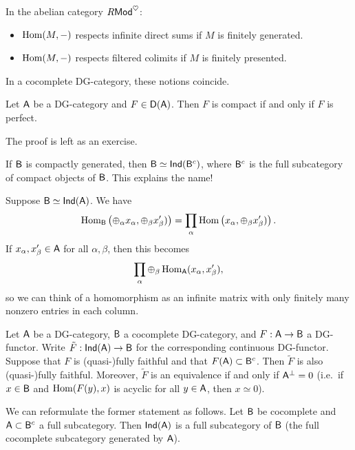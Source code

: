 \documentclass{amsart}
\begin{document}
\begin{rmk}
	In the abelian category $R\mathsf{Mod}^\heartsuit$:
	\begin{itemize}
		\item $\operatorname{Hom}(M, -)$ respects infinite direct sums if $M$ is finitely generated.
		\item $\operatorname{Hom}(M, -)$ respects filtered colimits if $M$ is finitely presented.
	\end{itemize}
	In a cocomplete DG-category, these notions coincide.
\end{rmk}

\begin{prop}
	Let $\mathsf{A}$ be a DG-category and $F \in \mathsf{D}(\mathsf{A})$.
	Then $F$ is compact if and only if $F$ is perfect.
\end{prop}

The proof is left as an exercise.

If $\mathsf{B}$ is compactly generated, then $\mathsf{B} \simeq \mathsf{Ind}(\mathsf{B}^c)$, where $\mathsf{B}^c$ is the full subcategory of compact objects of $\mathsf{B}$.
This explains the name!

\begin{rmk}
	Suppose $\mathsf{B} \simeq \mathsf{Ind}(\mathsf{A})$.
	We have
	\[
		\operatorname{Hom}_{\mathsf{B}}\left(\oplus_\alpha x_\alpha, \oplus_\beta x'_\beta)\right) = \prod_{\alpha} \operatorname{Hom}\left(x_\alpha, \oplus_\beta x'_\beta)\right).
	\]
	If $x_\alpha, x'_\beta \in \mathsf{A}$ for all $\alpha, \beta$, then this becomes
	\[
		\prod_\alpha \oplus_\beta \operatorname{Hom}_{\mathsf{A}}(x_\alpha, x'_\beta),
	\]
	so we can think of a homomorphism as an infinite matrix with only finitely many nonzero entries in each column.
\end{rmk}

\begin{cor}
	Let $\mathsf{A}$ be a DG-category, $\mathsf{B}$ a cocomplete DG-category, and $F: \mathsf{A} \to \mathsf{B}$ a DG-functor.
	Write $\tilde{F}: \mathsf{Ind}(\mathsf{A}) \to \mathsf{B}$ for the corresponding continuous DG-functor.
	Suppose that $F$ is (quasi-)fully faithful and that $F(\mathsf{A}) \subset \mathsf{B}^c$.
	Then $\tilde{F}$ is also (quasi-)fully faithful.
	Moreover, $\tilde{F}$ is an equivalence if and only if $\mathsf{A}^\perp = 0$ (i.e.\ if $x \in \mathsf{B}$ and $\operatorname{Hom}(F(y), x)$ is acyclic for all $y \in \mathsf{A}$, then $x \simeq 0$).
\end{cor}

We can reformulate the former statement as follows.
Let $\mathsf{B}$ be cocomplete and $\mathsf{A} \subset \mathsf{B}^c$ a full subcategory.
Then $\mathsf{Ind}(\mathsf{A})$ is a full subcategory of $\mathsf{B}$ (the full cocomplete subcategory generated by $\mathsf{A}$).
\end{document}
